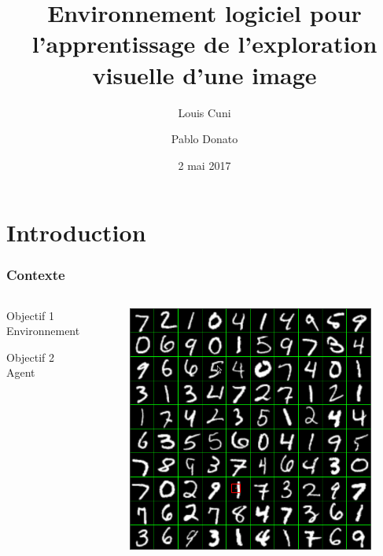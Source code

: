 \documentclass{beamer}
\title[Environnement pour l'exploration visuelle]{Environnement logiciel pour l'apprentissage de l'exploration visuelle d'une image}
\author{Louis Cuni \and Pablo Donato}
\institute[]{Université Pierre et Marie Curie -- Paris VI}
\date{2 mai 2017}
\begin{document}
\frame{\titlepage}

\section*{Introduction}

\begin{frame}
    \frametitle{Contexte}
    \begin{columns}[T]
        \begin{column}{.48\textwidth}
            \center
            \begin{block}{Objectif 1}
                Environnement
            \end{block}
            \begin{block}{Objectif 2}
                Agent
            \end{block}
        \end{column}
        \begin{column}{.48\textwidth}
            \begin{figure}
                \includegraphics[height=0.5\textheight]{numgrid10x10.png}
            \end{figure}
        \end{column}
    \end{columns}
\end{frame}
\end{document}
